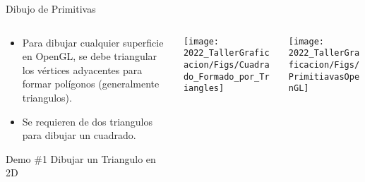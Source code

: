 \begin{frame}{Dibujo de Primitivas}
\begin{columns}
\begin{column}{0.4\textwidth}
\begin{itemize}
\item Para dibujar cualquier superficie en OpenGL, se debe triangular los vértices adyacentes para formar polígonos (generalmente triangulos).
\item Se requieren de dos triangulos para dibujar un cuadrado.
\end{itemize}
\begin{block}{Demo \#1}
Dibujar un Triangulo en 2D
\end{block}

\end{column}
\begin{column}{0.3\textwidth}
\begin{center}
 \texttt{[image: 2022\_TallerGraficacion/Figs/Cuadrado\_Formado\_por\_Triangles]}
 \end{center}

\end{column}
\begin{column}{0.3\textwidth}
\begin{center}
 \texttt{[image: 2022\_TallerGraficacion/Figs/PrimitiavasOpenGL]}
 \end{center}
\end{column}
\end{columns}


\end{frame}

